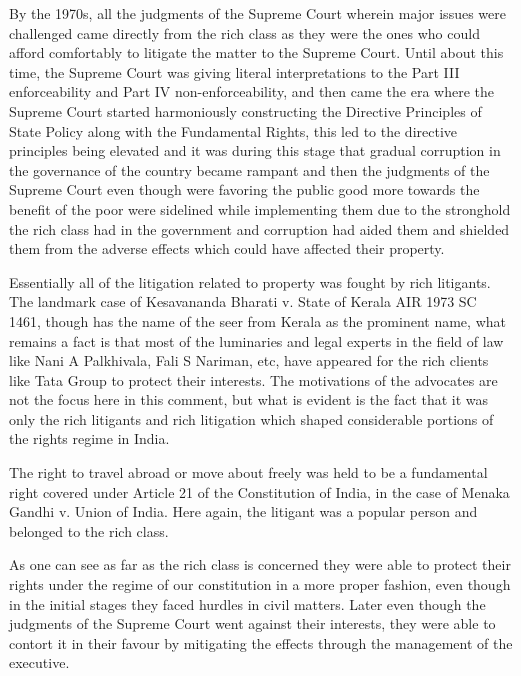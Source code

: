 \begin{multicols}{2}
\noi
By the 1970s, all the judgments of the Supreme Court wherein major issues were challenged came directly from the rich class as they were the ones who could afford comfortably to litigate the matter to the Supreme Court. Until about this time, the Supreme Court was giving literal interpretations to the Part III enforceability and Part IV non-enforceability, and then came the era where the Supreme Court started harmoniously constructing the Directive Principles of State Policy along with the Fundamental Rights, this led to the directive principles being elevated and it was during this stage that gradual corruption in the governance of the country became rampant and then the judgments of the Supreme Court even though were favoring the public good more towards the benefit of the poor were sidelined while implementing them due to the stronghold the rich class had in the government and corruption had aided them and shielded them from the adverse effects which could have affected their property.


\noi
Essentially all of the litigation related to property was fought by rich litigants. The landmark case of Kesavananda Bharati v. State of Kerala AIR 1973 SC 1461, though has the name of the seer from Kerala as the prominent name, what remains a fact is that most of the luminaries and legal experts in the field of law like Nani A Palkhivala, Fali S Nariman, etc, have appeared for the rich clients like Tata Group to protect their interests. The motivations of the advocates are not the focus here in this comment, but what is evident is the fact that it was only the rich litigants and rich litigation which shaped considerable portions of the rights regime in India.


\noi
The right to travel abroad or move about freely was held to be a fundamental right covered under Article 21 of the Constitution of India, in the case of Menaka Gandhi v. Union of India. Here again, the litigant was a popular person and belonged to the rich class.


\noi
As one can see as far as the rich class is concerned they were able to protect their rights under the regime of our constitution in a more proper fashion, even though in the initial stages they faced hurdles in civil matters. Later even though the judgments of the Supreme Court went against their interests, they were able to contort it in their favour by mitigating the effects through the management of the executive.


\end{multicols}
